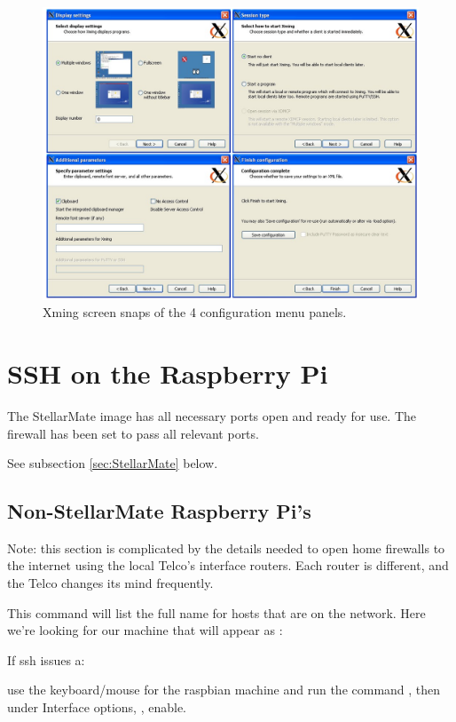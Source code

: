 \begin{figure}[h!]
\centering
\includegraphics[width=.75\textwidth]{images/XmingConfig.png}
\caption{Xming screen snaps of the 4 configuration menu panels.} %
\label{figure:}
\end{figure}


\newpage
\section{SSH on the Raspberry Pi}

The StellarMate image has all necessary ports open and ready for use.
The firewall has been set to pass all relevant ports.

See subsection \ref{sec:StellarMate} below.

\subsection{Non-StellarMate Raspberry Pi's}

Note: this section is complicated by the details needed to open
home firewalls to the internet using the local Telco's interface
routers. Each router is different, and the Telco changes its mind
frequently.

This command will list the full name for hosts that are on the network.
Here we're looking for our machine  that will appear
as :

{}

If ssh issues a:


use the keyboard/mouse for the raspbian machine and run the command
, then under Interface options,  , enable.


